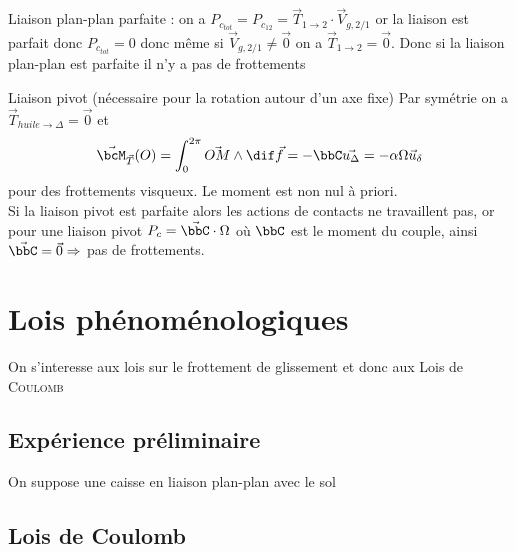         \begin{enumerate}
            \itt Liaison plan-plan parfaite : on a \( P_{c_{tot}} = P_{c_{12}} = \vec T_{1\to 2} \cdot \vec V_{g,2/1}\) or la liaison est parfait donc \(P_{c_{tot}} = 0\) donc même si \(\vec V_{g,2/1} \neq \vec 0\) on a \(\vec T_{1\to 2} = \vec 0\). Donc si la liaison plan-plan est parfaite il n'y a pas de frottements
    
            \itt Liaison pivot (nécessaire pour la rotation autour d'un axe fixe) %
            Par symétrie on a \(\vec T_{huile \to\Delta} = \vec 0\) et \[\vec \bcM_{\vec T}(O) = \int_0^{2\pi} \vec{OM} \wedge \dif \vec f = -\bbC \vec{u_{\Delta}} = - \alpha \Omega\vec u_{\delta}\] pour des frottements visqueux. Le moment est non nul à priori. \\ Si la liaison pivot est parfaite alors les actions de contacts ne travaillent pas, or pour une liaison pivot \(P_{c} = \vec \bbC\cdot \Omega\) où \(\bbC\) est le moment du couple, ainsi \(\vec \bbC = \vec 0 \Rightarrow\) pas de frottements.
        \end{enumerate}

    \section{Lois phénoménologiques}

    On s'interesse aux lois sur le frottement de glissement %
    et donc aux Lois de \textsc{Coulomb} %

    \subsection{Expérience préliminaire}
        On suppose une caisse en liaison plan-plan avec le sol %
    
        \begin{center} %
        \end{center}

    \subsection{Lois de Coulomb}

